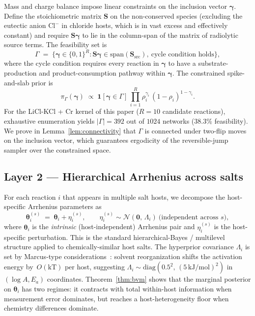 \documentclass[12pt]{article}
\theoremstyle{plain}
\theoremstyle{definition}
\theoremstyle{remark}
\begin{document}
Mass and charge balance impose linear constraints on the inclusion vector
$\boldsymbol\gamma$.  Define the stoichiometric matrix $\mathbf{S}$ on the
non-conserved species (excluding the eutectic anion $\mathrm{Cl}^-$ in
chloride hosts, which is in vast excess and effectively constant) and
require $\mathbf{S}\boldsymbol\gamma$ to lie in the column-span of the
matrix of radiolytic source terms.  The feasibility set is
%
\begin{equation}
  \Gamma \;=\; \bigl\{\boldsymbol\gamma\in\{0,1\}^R :
                 \mathbf{S}\boldsymbol\gamma \in \mathrm{span}(\mathbf{S}_{\mathrm{src}}),
                 \ \text{cycle condition holds}\bigr\},
  \label{eq:Gamma}
\end{equation}
%
where the cycle condition requires every reaction in $\boldsymbol\gamma$ to
have a substrate-production and product-consumption pathway within
$\boldsymbol\gamma$.  The constrained spike-and-slab prior is
%
\begin{equation}
  \pi_\Gamma(\boldsymbol\gamma) \;\propto\;
    \mathbf{1}[\boldsymbol\gamma\in\Gamma]\,
    \prod_{i=1}^R \rho_i^{\gamma_i}\,(1-\rho_i)^{1-\gamma_i}.
  \label{eq:prior_topology}
\end{equation}
%
For the LiCl-KCl + Cr kernel of this paper ($R=10$ candidate reactions),
exhaustive enumeration yields $|\Gamma| = 392$ out of $1024$ networks
($38.3\%$ feasibility).  We prove in Lemma~\ref{lem:connectivity}
that $\Gamma$ is connected under two-flip moves on the inclusion vector,
which guarantees ergodicity of the reversible-jump sampler over the
constrained space.

\subsection{Layer 2 --- Hierarchical Arrhenius across salts}\label{sec:framework:hier}

For each reaction $i$ that appears in multiple salt hosts, we decompose the
host-specific Arrhenius parameters as
%
\begin{equation}
  \boldsymbol\theta_i^{(s)} \;=\; \boldsymbol\theta_i + \eta_i^{(s)},
  \qquad \eta_i^{(s)} \sim \mathcal{N}(\mathbf{0},\,\Lambda_i)
  \ \text{(independent across $s$)},
  \label{eq:hierarchy}
\end{equation}
%
where $\boldsymbol\theta_i$ is the \emph{intrinsic} (host-independent)
Arrhenius pair and $\eta_i^{(s)}$ is the host-specific perturbation.  This
is the standard hierarchical-Bayes / multilevel structure
\citep[Ch.~5]{GelmanBDA3} applied to chemically-similar host salts.  The
hyperprior covariance $\Lambda_i$ is set by Marcus-type
considerations~\citep{Marcus1965}: solvent reorganization shifts the
activation energy by~$O(\mathrm{kT})$ per host, suggesting
$\Lambda_i \sim \mathrm{diag}(0.5^2,\,(5\,\mathrm{kJ/mol})^2)$ in
$(\log A, E_a)$ coordinates.  Theorem~\ref{thm:bvm} shows that the marginal
posterior on $\boldsymbol\theta_i$ has two regimes: it contracts with total
within-host information when measurement error dominates, but reaches a
host-heterogeneity floor when chemistry differences dominate.
\end{document}
